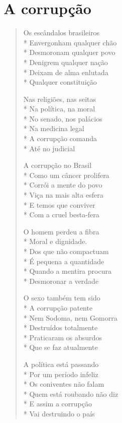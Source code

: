 \chapter{A corrupção}

\begin{verse}
Os escândalos brasileiros\\*
Envergonham qualquer chão\\*
Desmoronam qualquer povo\\*
Denigrem qualquer nação\\*
Deixam de alma enlutada\\*
Qualquer constituição

Nas religiões, nas seitas\\*
Na política, na moral\\*
No senado, nos palácios\\*
Na medicina legal\\*
A corrupção comanda\\*
Até no judicial

A corrupção no Brasil\\*
Como um câncer prolifera\\*
Corrói a mente do povo\\*
Viça na mais alta esfera\\*
E temos que conviver\\*
Com a cruel besta-fera

O homem perdeu a fibra\\*
Moral e dignidade.\\*
Dos que não compactuam\\*
É pequena a quantidade\\*
Quando a mentira procura\\*
Desmoronar a verdade

O sexo também tem sido\\*
A corrupção patente\\*
Nem Sodoma, nem Gomorra\\*
Destruídos totalmente\\*
Praticaram os absurdos\\*
Que se faz atualmente

A política está passando\\*
Por um período infeliz\\*
Os coniventes não falam\\*
Quem está roubando não diz\\*
E assim a corrupção\\*
Vai destruindo o país


\end{verse}
